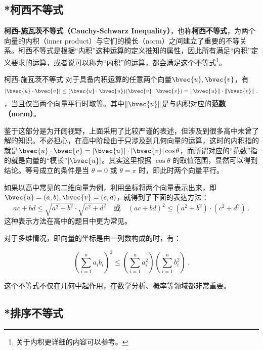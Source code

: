 \subsection{*柯西不等式}


\textbf{柯西-施瓦茨不等式（Cauchy-Schwarz Inequality）}，也称\textbf{柯西不等式}，为两个向量的内积（inner product）与它们的模长（norm）之间建立了重要的不等关系。柯西不等式是根据“内积”这种运算的定义推知的属性，因此所有满足“内积”定义要求的运算，或者说可以称为“内积”的运算，都会满足这个不等式\footnote{关于内积更详细的内容可以参考。}。

\begin{theorem}{柯西-施瓦茨不等式}
对于具备内积运算的任意两个向量$\bvec{u},\bvec{v}$，有
\begin{equation}
|\bvec{u} \cdot \bvec{v}| \leq (\bvec{u}\cdot\bvec{u})(\bvec{v}\cdot\bvec{v})=\|\bvec{u}\|\cdot\|\bvec{v}\|~.
\end{equation}
，当且仅当两个向量平行时取等。其中$\|\bvec{u}\|$是与内积对应的\textbf{范数（norm）}。
\end{theorem}

鉴于这部分是为开阔视野，上面采用了比较严谨的表述，但涉及到很多高中未曾了解的知识。不必担心，在高中阶段由于只涉及到几何向量的运算，这时的内积指的就是$\bvec{u}\cdot\bvec{v}=|\bvec{u}|\cdot|\bvec{v}|\cos\theta$，而所谓对应的“范数”指的就是向量的“模长”$|\bvec{u}|$。其实这里根据 $\cos \theta$ 的取值范围，显然可以得到结论。等号成立的条件是当 $\theta = 0$ 或 $\theta = \pi$ 时，即此时两个向量平行。

如果以高中常见的二维向量为例，利用坐标将两个向量表示出来，即$\bvec{u}=(a,b),\bvec{v}=(c,d)$，就得到了下面的表达方法：
\begin{equation}
ac+bd\leq\sqrt {a^2 + b^2}\cdot\sqrt{c^2 + d^2}\quad\text{或} \quad(ac+bd)^2\leq(a^2 + b^2)\cdot(c^2 + d^2)~.
\end{equation}
这种表示方法在高中的题目中更为常见。

对于多维情况，即向量的坐标是由一列数构成的时，有：

\begin{equation}
\left( \sum_{i=1}^{n} a_i b_i \right)^2\leq\left( \sum_{i=1}^{n} a_i^2 \right) \left( \sum_{i=1}^{n} b_i^2 \right) ~.
\end{equation}

这个不等式不仅在几何中起作用，在数学分析、概率等领域都非常重要。

\subsection{*排序不等式}

